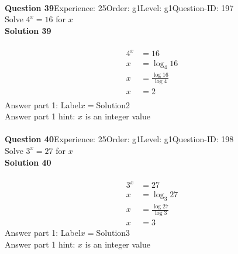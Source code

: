 \documentclass{article}
\begin{document}
\\[4pt]
\noindent\textbf{Question 39}\hspace{20pt}Experience: 25\hspace{20pt}Order: g1\hspace{20pt}Level: g1\hspace{20pt}Question-ID: 197\\[2pt]
Solve $4^x=16$ for $x$\\[4pt]
\noindent\textbf{Solution 39}\\[2pt]
\\[-35pt]\begin{align*}
4^x&=16\\[2pt]
x&=\log_{4}16\\[2pt]
x&=\displaystyle\frac{\log16}{\log4}\\[2pt]
x&=2\\[-105pt]
\end{align*}
Answer part 1: \hspace{10pt}Label\hspace{10pt}$x=$\hspace{10pt}Solution\hspace{10pt}2\\
Answer part 1 hint: \hspace{15pt}$x$ is an integer value\\
\\[4pt]
\noindent\textbf{Question 40}\hspace{20pt}Experience: 25\hspace{20pt}Order: g1\hspace{20pt}Level: g1\hspace{20pt}Question-ID: 198\\[2pt]
Solve $3^x=27$ for $x$\\[4pt]
\noindent\textbf{Solution 40}\\[2pt]
\\[-35pt]\begin{align*}
3^x&=27\\[2pt]
x&=\log_{3}27\\[2pt]
x&=\displaystyle\frac{\log27}{\log3}\\[2pt]
x&=3
\end{align*}
Answer part 1: \hspace{10pt}Label\hspace{10pt}$x=$\hspace{10pt}Solution\hspace{10pt}3\\
Answer part 1 hint: \hspace{15pt}$x$ is an integer value\\
\end{document}
